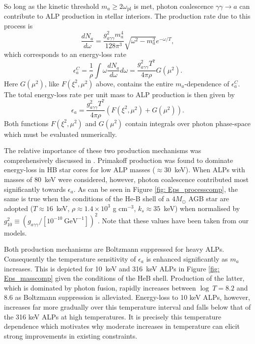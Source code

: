 So long as the kinetic threshold $m_a\geq2\omega_{\mathrm{pl}}$ is met, photon coalescence $\gamma \gamma \to a$ can contribute to ALP production in stellar interiors. The production rate due to this process is \cite{DiLella:2000dn}
\begin{equation}
    \frac{dN_a}{d\omega}=\frac{g_{a\gamma\gamma}^2m_a^4}{128\pi^3}\sqrt{\omega^2-m_a^2}e^{-\omega/T},
\end{equation}
which corresponds to an energy-loss rate
\begin{equation}
    \epsilon_{a}^C=\frac{1}{\rho}\int\omega\frac{dN_a}{d\omega}d\omega=\frac{g_{a\gamma\gamma}^2T^7}{4\pi\rho}G(\mu^2).
    \label{eq: G function}
\end{equation}
Here $G(\mu^2)$, like $F(\xi^2, \mu^2)$ above, contains the entire $m_a$-dependence of $\epsilon_a^C$. The total energy-loss rate per unit mass to ALP production is then given by
\begin{equation}
    \epsilon_a=\frac{g_{a\gamma\gamma}^2T^7}{4\pi\rho}(F(\xi^2, \mu^2)+G(\mu^2)).
\end{equation}
Both functions $F(\xi^2, \mu^2)$ and $G(\mu^2)$ contain integrals over photon phase-space which must be evaluated numerically.




The relative importance of these two production mechanisms was comprehensively discussed in \cite{Carenza:2020zil}. Primakoff production was found to dominate energy-loss in HB star cores for low ALP masses ($\approx30$~keV). When ALPs with masses of $80$~keV were considered, however, photon coalescence contributed most significantly towards $\epsilon_a$. As can be seen in Figure \ref{fig: Eps_processcomp}, the same is true when the conditions of the He-B shell of a $4M_{\odot}$ AGB star are adopted ($T\approx16$~keV, $\rho\approx1.4\times10^3$ g cm$^{-3}$, $k_s\approx35$~keV) when normalised by $g_{10}^2\equiv (g_{a\gamma\gamma}/[10^{-10}\ \mathrm{GeV}^{-1}])^2$. Note that these values have been taken from our models.




Both production mechanisms are Boltzmann suppressed for heavy ALPs. Consequently the temperature sensitivity of $\epsilon_a$ is enhanced significantly as $m_a$ increases. This is depicted for 10~keV and 316~keV ALPs in Figure \ref{fig: Eps_masscomp} given the conditions of the HeB shell. Production of the latter, which is dominated by photon fusion, rapidly increases between $\log\ T=8.2$ and $8.6$ as Boltzmann suppression is alleviated. Energy-loss to 10 keV ALPs, however, increases far more gradually over this temperature interval and falls below that of the 316 keV ALPs at high temperatures. It is precisely this temperature dependence which motivates why moderate increases in temperature can elicit strong improvements in existing constraints. 


